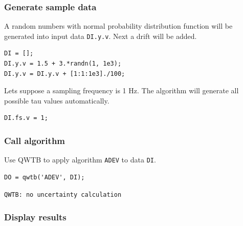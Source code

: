 \startcontents[localtoc]



{}
\subsubsection*{Generate sample data}



A random numbers with normal probability distribution function will be generated into input data \texttt{DI.y.v}. Next a drift will be added.

\begin{lstlisting}
DI = [];
DI.y.v = 1.5 + 3.*randn(1, 1e3);
DI.y.v = DI.y.v + [1:1:1e3]./100;
\end{lstlisting}


Lets suppose a sampling frequency is 1 Hz. The algorithm will generate all possible tau values automatically.

\begin{lstlisting}
DI.fs.v = 1;
\end{lstlisting}


{}
\subsubsection*{Call algorithm}



Use QWTB to apply algorithm \texttt{ADEV} to data \texttt{DI}.

\begin{lstlisting}
DO = qwtb('ADEV', DI);
\end{lstlisting}
\begin{lstlisting}[language={},xleftmargin=5pt,frame=none]
QWTB: no uncertainty calculation

\end{lstlisting}


{}
\subsubsection*{Display results}



